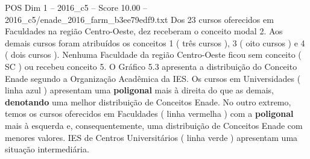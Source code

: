 \begin{textsample}{POS Dim 1 – 2016\_c5 – Score 10.00 – 2016\_c5/enade\_2016\_farm\_b3ee79edf9.txt}
Dos 23 cursos oferecidos em Faculdades na região Centro-Oeste, dez receberam o conceito modal 2.
Aos demais cursos foram atribuídos os conceitos 1 ( três cursos ), 3 ( oito cursos ) e 4 ( dois cursos ).
Nenhuma Faculdade da região Centro-Oeste ficou sem conceito ( SC ) ou recebeu conceito 5.
O Gráfico 5.3 apresenta a distribuição do Conceito Enade segundo a Organização Acadêmica da IES.
Os cursos em Universidades ( linha azul ) apresentam uma \textbf{poligonal} mais à direita do que as demais, \textbf{denotando} uma melhor distribuição de Conceitos Enade.
No outro extremo, temos os cursos oferecidos em Faculdades ( linha vermelha ) com a \textbf{poligonal} mais à esquerda e, consequentemente, uma distribuição de Conceitos Enade com menores valores.
IES de Centros Universitários ( linha verde ) apresentam uma situação intermediária.

\end{textsample}
